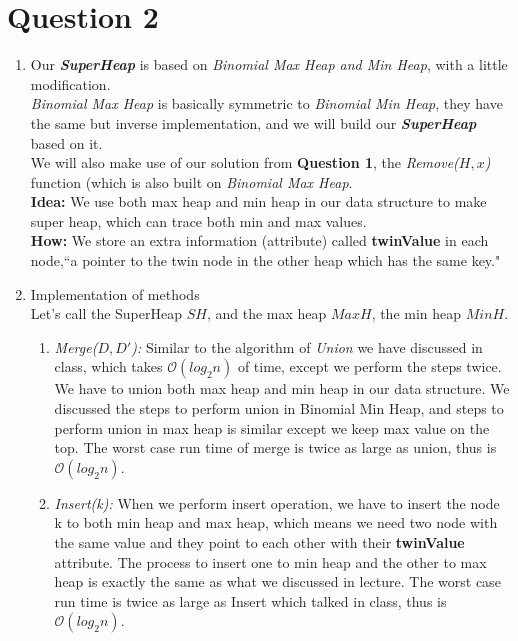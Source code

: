 \documentclass[10pt]{article}
\begin{document}
\section*{Question 2}
\begin{enumerate}
\item
Our \textbf{\textit{SuperHeap}} is based on \textit{Binomial Max Heap and Min Heap}, with a little modification.\\
\textit{Binomial Max Heap} is basically symmetric to \textit{Binomial Min Heap}, they have the same but inverse implementation, and we will build our \textbf{\textit{SuperHeap}} based on it.\\
We will also make use of our solution from \textbf{Question 1}, the \textit{Remove($H, x$)} function (which is also built on \textit{Binomial Max Heap}.\\
\textbf{Idea:} We use both max heap and min heap in our data structure to make super heap, which can trace both min and max values.\\
\textbf{How:} We store an extra information (attribute) called \textbf{twinValue} in each node,``a pointer to the twin node in the other heap which has the same key."\\

\item Implementation of methods\\
Let's call the SuperHeap $SH$, and the max heap $MaxH$, the min heap $MinH$.
\begin{enumerate}
\item \textit{Merge($D, D'$):}
Similar to the algorithm of \textit{Union} we have discussed in class, which takes $\mathcal{O}(log_2n)$ of time, except we perform the steps twice. We have to union both max heap and min heap in our data structure. We discussed the steps to perform union in Binomial Min Heap, and steps to perform union in max heap is similar except we keep max value on the top. The worst case run time of merge is twice as large as union, thus is $\mathcal{O}(log_2n)$.

\item \textit{Insert(k):} 
When we perform insert operation, we have to insert the node k to both min heap and max heap, which means we need two node with the same value and they point to each other with their \textbf{twinValue} attribute. The process to insert one to min heap and the other to max heap is exactly the same as what we discussed in lecture. The worst case run time is twice as large as Insert which talked in class, thus is $\mathcal{O}(log_2n)$.


\end{enumerate}
\end{enumerate}
\end{document}
